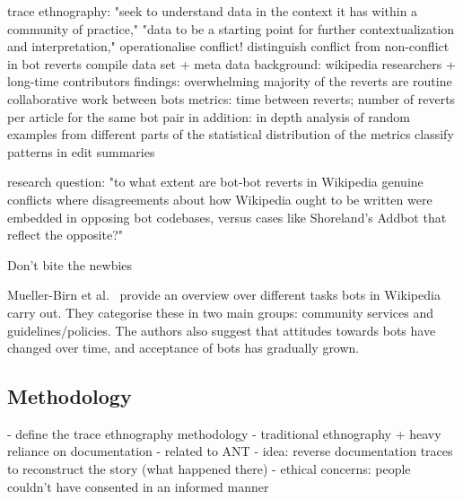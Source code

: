 \documentclass[pdftex,a4paper,11pt]{scrartcl}
\begin{document}
trace ethnography: "seek to understand data in the context it has within a community of practice," "data to be a starting point for further contextualization and interpretation,"
operationalise conflict!
distinguish conflict from non-conflict in bot reverts
compile data set + meta data
background: wikipedia researchers + long-time contributors
findings: overwhelming majority of the reverts are routine collaborative work between bots
metrics: time between reverts; number of reverts per article for the same bot pair
in addition: in depth analysis of random examples from different parts of the statistical distribution of the metrics
classify patterns in edit summaries

research question: "to what extent are bot-bot reverts
in Wikipedia genuine conflicts where disagreements about how Wikipedia ought to be written were
embedded in opposing bot codebases, versus cases like Shoreland’s Addbot that reflect the opposite?"

\cite{HalKitRied2011}
Don't bite the newbies

\cite{MuellerBirn2014}
  Mueller-Birn et al.~\cite{MuellerBirn2014} provide an overview over different tasks bots in Wikipedia carry out.
  They categorise these in two main groups: community services and guidelines/policies.
  The authors also suggest that attitudes towards bots have changed over time, and acceptance of bots has gradually grown.


\subsection{Methodology}
\cite{GeiRib2011}
- define the trace ethnography methodology
- traditional ethnography + heavy reliance on documentation
- related to ANT
- idea: reverse documentation traces to reconstruct the story (what happened
  there)
- ethical concerns: people couldn't have consented in an informed manner
\end{document}
